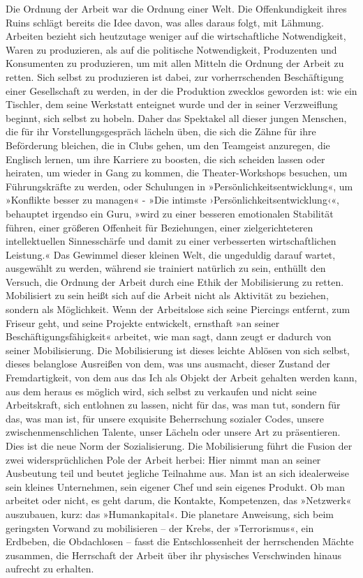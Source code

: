 Die Ordnung der Arbeit war die Ordnung einer Welt. Die
Offenkundigkeit ihres Ruins schlägt bereits die Idee davon, was
alles daraus folgt, mit Lähmung. Arbeiten bezieht sich heutzutage
weniger auf die wirtschaftliche Notwendigkeit, Waren zu
produzieren, als auf die politische Notwendigkeit, Produzenten und
Konsumenten zu produzieren, um mit allen Mitteln die Ordnung der
Arbeit zu retten. Sich selbst zu produzieren ist dabei, zur
vorherrschenden Beschäftigung einer Gesellschaft zu werden, in der
die Produktion zwecklos geworden ist: wie ein Tischler, dem seine
Werkstatt enteignet wurde und der in seiner Verzweiflung beginnt,
sich selbst zu hobeln. Daher das Spektakel all dieser jungen
Menschen, die für ihr Vorstellungsgespräch lächeln üben, die sich
die Zähne für ihre Beförderung bleichen, die in Clubs gehen, um den
Teamgeist anzuregen, die Englisch lernen, um ihre Karriere zu
boosten, die sich scheiden lassen oder heiraten, um wieder in Gang
zu kommen, die Theater-Workshops besuchen, um Führungskräfte zu
werden, oder Schulungen in »Persönlichkeitsentwicklung«, um
»Konflikte besser zu managen« - »Die intimste
›Persönlichkeitsentwicklung‹«, behauptet irgendso ein Guru, »wird
zu einer besseren emotionalen Stabilität führen, einer größeren
Offenheit für Beziehungen, einer zielgerichteteren intellektuellen
Sinnesschärfe und damit zu einer verbesserten wirtschaftlichen
Leistung.« Das Gewimmel dieser kleinen Welt, die ungeduldig darauf
wartet, ausgewählt zu werden, während sie trainiert natürlich zu
sein, enthüllt den Versuch, die Ordnung der Arbeit durch eine Ethik
der Mobilisierung zu retten. Mobilisiert zu sein heißt sich auf die
Arbeit nicht als Aktivität zu beziehen, sondern als Möglichkeit.
Wenn der Arbeitslose sich seine Piercings entfernt, zum Friseur
geht, und seine Projekte entwickelt, ernsthaft »an seiner
Beschäftigungsfähigkeit« arbeitet, wie man sagt, dann zeugt er
dadurch von seiner Mobilisierung. Die Mobilisierung ist dieses
leichte Ablösen von sich selbst, dieses belanglose Ausreißen von
dem, was uns ausmacht, dieser Zustand der Fremdartigkeit, von dem
aus das Ich als Objekt der Arbeit gehalten werden kann, aus dem
heraus es möglich wird, sich selbst zu verkaufen und nicht seine
Arbeitskraft, sich entlohnen zu lassen, nicht für das, was man tut,
sondern für das, was man ist, für unsere exquisite Beherrschung
sozialer Codes, unsere zwischenmenschlichen Talente, unser Lächeln
oder unsere Art zu präsentieren. Dies ist die neue Norm der
Sozialisierung. Die Mobilisierung führt die Fusion der zwei
widersprüchlichen Pole der Arbeit herbei: Hier nimmt man an seiner
Ausbeutung teil und beutet jegliche Teilnahme aus. Man ist an sich
idealerweise sein kleines Unternehmen, sein eigener Chef und sein
eigenes Produkt. Ob man arbeitet oder nicht, es geht darum, die
Kontakte, Kompetenzen, das »Netzwerk« auszubauen, kurz: das
»Humankapital«. Die planetare Anweisung, sich beim geringsten
Vorwand zu mobilisieren – der Krebs, der »Terrorismus«, ein
Erdbeben, die Obdachlosen – fasst die Entschlossenheit der
herrschenden Mächte zusammen, die Herrschaft der Arbeit über ihr
physisches Verschwinden hinaus aufrecht zu erhalten.

